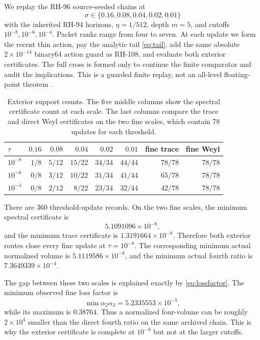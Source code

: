 \documentclass[11pt]{article}
\theoremstyle{definition}
\theoremstyle{remark}
\begin{document}
We replay the RH-96 source-seeded chains at
\[
 \sigma\in\{0.16,0.08,0.04,0.02,0.01\}
\]
with the inherited RH-94 horizons, $\eta=1/512$, depth $m=5$, and cutoffs
$10^{-8},10^{-6},10^{-4}$.  Packet ranks range from four to seven.  At each
update we form the recent thin action, pay the analytic tail
\eqref{eq:tail}, add the same absolute $2\times10^{-14}$ binary64 action
guard as RH-108, and evaluate both exterior certificates.  The full cross is
formed only to continue the finite comparator and audit the implications.
This is a guarded finite replay, not an all-level floating-point theorem
\citep{Rump2010}.

\begin{table}[t]
\centering
\small
\caption{Exterior support counts.  The five middle columns show the spectral
certificate count at each scale.  The last columns compare the trace and
direct Weyl certificates on the two fine scales, which contain 78 updates
for each threshold.}
\label{tab:counts}
\begin{tabular}{@{}lrrrrr rr@{}}
\toprule
$\tau$ & $0.16$ & $0.08$ & $0.04$ & $0.02$ & $0.01$
& fine trace & fine Weyl\\
\midrule
$10^{-8}$ & $1/8$ & $5/12$ & $15/22$ & $34/34$ & $44/44$ & $78/78$ & $78/78$\\
$10^{-6}$ & $0/8$ & $3/12$ & $10/22$ & $31/34$ & $41/44$ & $65/78$ & $78/78$\\
$10^{-4}$ & $0/8$ & $2/12$ & $8/22$ & $23/34$ & $32/44$ & $42/78$ & $78/78$\\
\bottomrule
\end{tabular}
\end{table}

There are 360 threshold-update records.  On the two fine scales, the
minimum spectral certificate is
\begin{equation}
 5.1091096\times10^{-8},
 \label{eq:minspec}
\end{equation}
and the minimum trace certificate is
$1.3191664\times10^{-8}$.  Therefore both exterior routes close every fine
update at $\tau=10^{-8}$.  The corresponding minimum actual normalized
volume is $5.1119586\times10^{-8}$, and the minimum actual fourth ratio is
$7.3649339\times10^{-4}$.

The gap between these two scales is explained exactly by
\eqref{eq:lossfactor}.  The minimum observed fine loss factor is
\begin{equation}
 \min\alpha_2\alpha_3=5.2335553\times10^{-5},
 \label{eq:lossvalue}
\end{equation}
while its maximum is $0.38764$.  Thus a normalized four-volume can be roughly
$2\times10^4$ smaller than the direct fourth ratio on the same archived
chain.  This is why the exterior certificate is complete at $10^{-8}$ but
not at the larger cutoffs.
\end{document}
